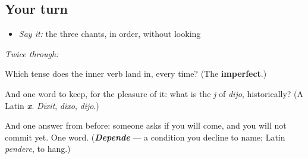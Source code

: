\subsection*{Your turn}
\begin{itemize}
\raggedright
  \item \emph{Say it:} the three chants, in order, without looking
\end{itemize}

\emph{Twice through:}

\begin{tcolorbox}[breakable,colback=teal!4,colframe=teal!35!black,title={Before you move on}]
Which tense does the inner verb land in, every time? (The \textbf{imperfect}.)

And one word to keep, for the pleasure of it: what is the \emph{j} of \emph{dijo}, historically? (A Latin \emph{\textbf{x}}. \emph{Dīxit}, \emph{dixo}, \emph{dijo}.)

And one answer from before: someone asks if you will come, and you will not commit yet. One word. (\emph{\textbf{Depende}} — a condition you decline to name; Latin \emph{pendere}, to hang.)
\end{tcolorbox}
